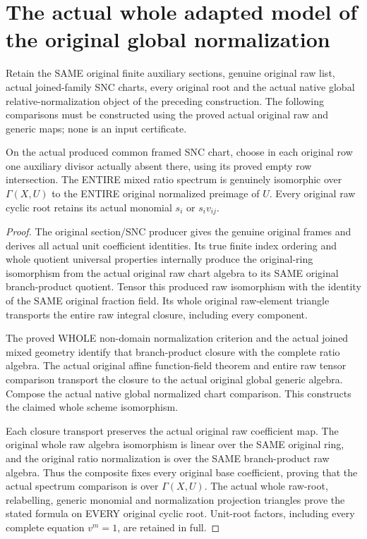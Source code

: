 \section{The actual whole adapted model of the original global normalization}
\label{sec:kn-nadel-global-adapted-model}

Retain the SAME original finite auxiliary sections, genuine original raw list,
actual joined-family SNC charts, every original root and the actual native
global relative-normalization object of the preceding construction. The
following comparisons must be constructed using the proved actual original
raw and generic maps; none is an input certificate.

\begin{lemma}
\label{lem:kn-nadel-whole-native-ratio-model}
\notready
On the actual produced common framed SNC chart, choose in each original row
one auxiliary divisor actually absent there, using its proved empty row
intersection. The ENTIRE mixed ratio spectrum is genuinely isomorphic over
$\Gamma(X,U)$ to the ENTIRE original normalized preimage of $U$. Every original
raw cyclic root retains its actual monomial $s_i$ or $s_i v_{ij}$.
\end{lemma}
\begin{proof}
The original section/SNC producer gives the genuine original frames and derives
all actual unit coefficient identities. Its true finite index ordering and
whole quotient universal properties internally produce the original-ring
isomorphism from the actual original raw chart algebra to its SAME original
branch-product quotient. Tensor this produced raw isomorphism with the identity
of the SAME original fraction field. Its whole original raw-element triangle
transports the entire raw integral closure, including every component.

The proved WHOLE non-domain normalization criterion and the actual
joined mixed geometry identify that branch-product closure with the complete
ratio algebra. The actual original affine function-field theorem and entire
raw tensor comparison transport the closure to the actual original global
generic algebra. Compose the actual native global normalized chart comparison.
This constructs the claimed whole scheme isomorphism.

Each closure transport preserves the actual original raw coefficient map.
The original whole raw algebra isomorphism is linear over the SAME original
ring, and the original ratio normalization is over the SAME branch-product raw
algebra. Thus the composite fixes every original base coefficient, proving
that the actual spectrum comparison is over $\Gamma(X,U)$. The actual whole
raw-root, relabelling, generic monomial and normalization projection triangles
prove the stated formula on EVERY original cyclic root. Unit-root factors,
including every complete equation $v^m=1$, are retained in full.
\end{proof}


